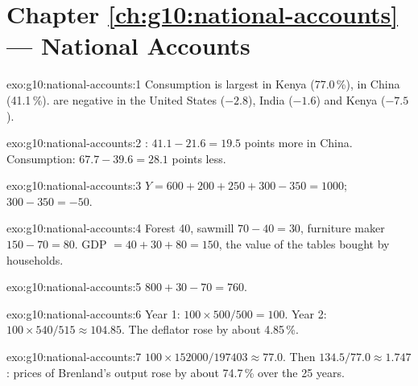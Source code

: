 \section*{Chapter \ref{ch:g10:national-accounts} --- National Accounts}

\begin{solution}{exo:g10:national-accounts:1}
Consumption is largest in Kenya (77.0\,\%),  in China (41.1\,\%).  are negative in the United States ($-2.8$), India ($-1.6$) and Kenya ($-7.5$).
\end{solution}

\begin{solution}{exo:g10:national-accounts:2}
: $41.1 - 21.6 = 19.5$ points more in China. Consumption: $67.7 - 39.6 = 28.1$ points less.
\end{solution}

\begin{solution}{exo:g10:national-accounts:3}
$Y = 600 + 200 + 250 + 300 - 350 = 1000$;  $300 - 350 = -50$.
\end{solution}

\begin{solution}{exo:g10:national-accounts:4}
Forest 40, sawmill $70 - 40 = 30$, furniture maker $150 - 70 = 80$. GDP $= 40 + 30 + 80 = 150$, the value of the tables bought by households.
\end{solution}

\begin{solution}{exo:g10:national-accounts:5}
$800 + 30 - 70 = 760$.
\end{solution}

\begin{solution}{exo:g10:national-accounts:6}
Year 1: $100 \times 500/500 = 100$. Year 2: $100 \times 540/515 \approx 104.85$. The deflator rose by about 4.85\,\%.
\end{solution}

\begin{solution}{exo:g10:national-accounts:7}
$100 \times 152000/197403 \approx 77.0$. Then $134.5/77.0 \approx 1.747$: prices of Brenland's output rose by about 74.7\,\% over the 25 years.
\end{solution}

